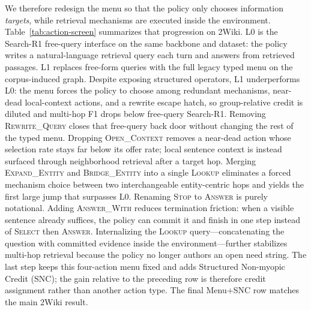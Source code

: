 \documentclass[letterpaper]{article} %
\begin{document}
We therefore redesign the menu so that the policy only chooses information \emph{targets}, while retrieval mechanisms are executed inside the environment.
Table~\ref{tab:action-screen} summarizes that progression on 2Wiki.
L0 is the Search-R1 free-query interface on the same backbone and dataset: the policy writes a natural-language retrieval query each turn and answers from retrieved passages.
L1 replaces free-form queries with the full legacy typed menu on the corpus-induced graph.
Despite exposing structured operators, L1 underperforms L0: the menu forces the policy to choose among redundant mechanisms, near-dead local-context actions, and a rewrite escape hatch, so group-relative credit is diluted and multi-hop F1 drops below free-query Search-R1.
Removing \textsc{Rewrite\_Query} closes that free-query back door without changing the rest of the typed menu.
Dropping \textsc{Open\_Context} removes a near-dead action whose selection rate stays far below its offer rate; local sentence context is instead surfaced through neighborhood retrieval after a target hop.
Merging \textsc{Expand\_Entity} and \textsc{Bridge\_Entity} into a single \textsc{Lookup} eliminates a forced mechanism choice between two interchangeable entity-centric hops and yields the first large jump that surpasses L0.
Renaming \textsc{Stop} to \textsc{Answer} is purely notational.
Adding \textsc{Answer\_With} reduces termination friction: when a visible sentence already suffices, the policy can commit it and finish in one step instead of \textsc{Select} then \textsc{Answer}.
Internalizing the \textsc{Lookup} query---concatenating the question with committed evidence inside the environment---further stabilizes multi-hop retrieval because the policy no longer authors an open need string.
The last step keeps this four-action menu fixed and adds Structured Non-myopic Credit (SNC); the gain relative to the preceding row is therefore credit assignment rather than another action type.
The final Menu+SNC row matches the main 2Wiki result.
\end{document}
